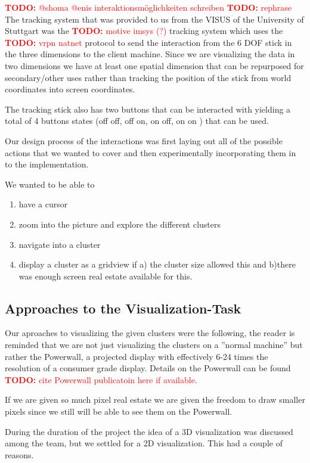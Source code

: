 \documentclass[journal]{vgtc}       %
\newcommand{\todo}[1]{\textcolor{red}{\textbf{TODO:} #1}}
\begin{document}
\todo{@shoma @enis interaktionsmöglichkeiten schreiben}
\todo{rephrase}
The tracking system that was provided to us from the VISUS of the University of Stuttgart was the \todo{motive imsys (?)} tracking system which uses the \todo{vrpn natnet} protocol to send the interaction from the 6 DOF stick in the three dimensions to the client machine. 
Since we are visualizing the data in two dimensions we have at least one spatial dimension that can be repurposed for secondary/other uses rather than tracking the position of the stick from world coordinates into screen coordinates.

The tracking stick also has two buttons that can be interacted with yielding a total of 4 buttons states (off off, off on, on off, on on ) that can be used.

Our design process of the interactions was first  laying out all of the possible actions that we wanted to cover and then experimentally incorporating them in to the implementation.

We wanted to be able to 
\begin{enumerate}
  \item have a cursor 
  \item zoom into the picture and  explore the different clusters
  \item navigate into a cluster
  \item display a cluster as a gridview if a) the cluster size allowed this and b)there was enough screen real estate available for this.
  
\end{enumerate}
\subsection{Approaches to the Visualization-Task}

Our aproaches to visualizing the given clusters were the following, the reader is reminded that we are not just visualizing the clusters on a ''normal machine'' but rather the Powerwall, a projected display with effectively 6-24 times the resolution of a consumer grade display. Details on the Powerwall can be found \todo{cite Powerwall publicatoin here if available}. \cite{Powerwall}

If we are given so much pixel real estate we are given the freedom to draw smaller pixels since we still will be able to see them on the Powerwall.

During the duration of the project the idea of a 3D visualization was discussed among the team, but we settled for a 2D visualization. This had a couple of reasons.
\end{document}
